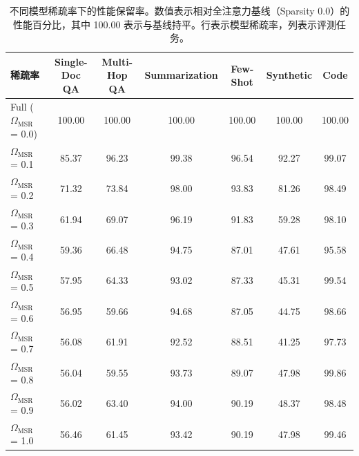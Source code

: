 \begin{table}[t]
\centering
\caption{不同模型稀疏率下的性能保留率。数值表示相对全注意力基线（Sparsity 0.0）的性能百分比，其中 100.00 表示与基线持平。行表示模型稀疏率，列表示评测任务。}
\label{tab:sparsity_performance_matrix}
\begin{small}
\begin{tabular}{l|cccccc}
\toprule
\textbf{稀疏率} & \textbf{Single-Doc QA} & \textbf{Multi-Hop QA} & \textbf{Summarization} & \textbf{Few-Shot} & \textbf{Synthetic} & \textbf{Code} \\
\midrule
Full ($\Omega_{\mathrm{MSR}}$ = 0.0) & 100.00 & 100.00 & 100.00 & 100.00 & 100.00 & 100.00 \\
\midrule
$\Omega_{\mathrm{MSR}}$ = 0.1 & 85.37 & 96.23 & 99.38 & 96.54 & 92.27 & 99.07 \\
$\Omega_{\mathrm{MSR}}$ = 0.2 & 71.32 & 73.84 & 98.00 & 93.83 & 81.26 & 98.49 \\
$\Omega_{\mathrm{MSR}}$ = 0.3 & 61.94 & 69.07 & 96.19 & 91.83 & 59.28 & 98.10 \\
$\Omega_{\mathrm{MSR}}$ = 0.4 & 59.36 & 66.48 & 94.75 & 87.01 & 47.61 & 95.58 \\
$\Omega_{\mathrm{MSR}}$ = 0.5 & 57.95 & 64.33 & 93.02 & 87.33 & 45.31 & 99.54 \\
$\Omega_{\mathrm{MSR}}$ = 0.6 & 56.95 & 59.66 & 94.68 & 87.05 & 44.75 & 98.66 \\
$\Omega_{\mathrm{MSR}}$ = 0.7 & 56.08 & 61.91 & 92.52 & 88.51 & 41.25 & 97.73 \\
$\Omega_{\mathrm{MSR}}$ = 0.8 & 56.04 & 59.55 & 93.73 & 89.07 & 47.98 & 99.86 \\
$\Omega_{\mathrm{MSR}}$ = 0.9 & 56.02 & 63.40 & 94.00 & 90.19 & 48.37 & 98.48 \\
$\Omega_{\mathrm{MSR}}$ = 1.0 & 56.46 & 61.45 & 93.42 & 90.19 & 47.98 & 99.46 \\
\bottomrule
\end{tabular}
\end{small}
\end{table}
